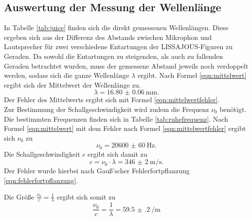 \subsection{Auswertung der Messung der Wellenlänge}
In Tabelle \ref{tab:juice} finden sich die direkt gemessenen Wellenlängen. Diese ergeben sich aus der Differenz des Abstands zwischen Mikrophon und Lautsprecher für zwei verschiedene Entartungen der LISSAJOUS-Figuren zu Geraden.
Da sowohl die Entartungen zu steigenden, als auch zu fallenden Geraden betrachtet wurden, muss der gemessene Abstand jeweils noch verdoppelt werden, sodass sich die ganze Wellenlänge $\lambda$ ergibt.
Nach Formel \eqref{eqn:mittelwert} ergibt sich der Mittelwert der Wellenlänge zu.
\begin{equation}
	\label{eqn:wellenlänge}
	\lambda=\SI{16.80(6)}{\milli\metre}\text{.}
\end{equation}
Der Fehler des Mittelwerts ergibt sich mit Formel \eqref{eqn:mittelwertfehler}.\\
Zur Bestimmung der Schallgeschwindigkeit wird zudem die Frequenz $\nu_{0}$ benötigt.
Die bestimmten Frequenzen finden sich in Tabelle \ref{tab:ruhefrequenz}.
Nach Formel \eqref{eqn:mittelwert} mit dem Fehler nach Formel \eqref{eqn:mittelwertfehler} ergibt sich $\nu_0$ zu
\begin{equation}
	\label{eqn:rrrruhe}
	\nu_0=\SI{20600(60)}{\Hz}\text{.}
\end{equation}
Die Schallgeschwindigkeit $c$ ergibt sich damit zu
\begin{equation}
	\label{eqn:Schallgeschwindigkeit}
	c=\nu_0 \cdot\lambda=\SI{346(2)}{\meter\per\second}\text{.}
\end{equation}
Der Fehler wurde hierbei nach Gauß'scher Fehlerfortpflanzung \eqref{eqn:fehlerfortpflanzung}.

Die Größe $\frac{\nu_0}{c}=\frac{1}{\lambda}$ ergibt sich somit zu
\begin{equation}
	\label{eqn:wichtige_größe}
	\frac{\nu_0}{c}=\frac{1}{\lambda}=\SI{59.5(2)}{\per\meter}
\end{equation}



